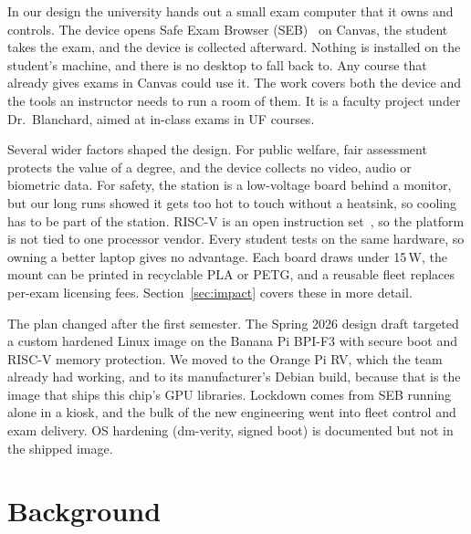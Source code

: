 \documentclass[11pt]{article}
\begin{document}
In our design the university hands out a small exam computer that it owns and controls. The device opens Safe Exam Browser (SEB)~\cite{safeexambrowser} on Canvas, the student takes the exam, and the device is collected afterward. Nothing is installed on the student's machine, and there is no desktop to fall back to. Any course that already gives exams in Canvas could use it. The work covers both the device and the tools an instructor needs to run a room of them. It is a faculty project under Dr.~Blanchard, aimed at in-class exams in UF courses.

Several wider factors shaped the design. For public welfare, fair assessment protects the value of a degree, and the device collects no video, audio or biometric data. For safety, the station is a low-voltage board behind a monitor, but our long runs showed it gets too hot to touch without a heatsink, so cooling has to be part of the station. RISC-V is an open instruction set~\cite{asanovic2014}, so the platform is not tied to one processor vendor. Every student tests on the same hardware, so owning a better laptop gives no advantage. Each board draws under 15\,W, the mount can be printed in recyclable PLA or PETG, and a reusable fleet replaces per-exam licensing fees. Section~\ref{sec:impact} covers these in more detail.

The plan changed after the first semester. The Spring 2026 design draft targeted a custom hardened Linux image on the Banana Pi BPI-F3 with secure boot and RISC-V memory protection. We moved to the Orange Pi RV, which the team already had working, and to its manufacturer's Debian build, because that is the image that ships this chip's GPU libraries. Lockdown comes from SEB running alone in a kiosk, and the bulk of the new engineering went into fleet control and exam delivery. OS hardening (dm-verity, signed boot) is documented but not in the shipped image.

\section{Background}
\end{document}

